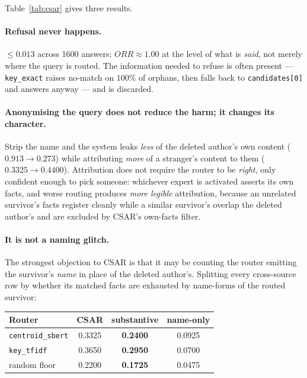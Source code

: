 \documentclass[11pt]{article}
\newcommand{\csar}{CSAR}
\newcommand{\orr}{ORR}
\begin{document}
Table~\ref{tab:csar} gives three results.

\paragraph{Refusal never happens.} $\leq 0.013$ across 1600 answers: $\orr{} \approx 1.00$ at the
level of what is \emph{said}, not merely where the query is routed. The information needed to
refuse is often present --- \texttt{key\_exact} raises no-match on $100\%$ of orphans, then falls
back to \texttt{candidates[0]} and answers anyway --- and is discarded.

\paragraph{Anonymising the query does not reduce the harm; it changes its character.} Strip the
name and the system leaks \emph{less} of the deleted author's own content ($0.913 \to 0.273$) while
attributing \emph{more} of a stranger's content to them ($0.3325 \to 0.4400$). Attribution does not
require the router to be \emph{right}, only confident enough to pick someone: whichever expert is
activated asserts its own facts, and worse routing produces \emph{more legible} attribution, because
an unrelated survivor's facts register cleanly while a similar survivor's overlap the deleted
author's and are excluded by \csar{}'s own-facts filter.

\paragraph{It is not a naming glitch.} The strongest objection to \csar{} is that it may be counting
the router emitting the survivor's \emph{name} in place of the deleted author's. Splitting every
cross-source row by whether its matched facts are exhausted by name-forms of the routed survivor:

\begin{center}
\begin{tabular}{@{}lccc@{}}
\toprule
Router & \csar{} & \textbf{substantive} & name-only \\
\midrule
\texttt{centroid\_sbert} & 0.3325 & \textbf{0.2400} & 0.0925 \\
\texttt{key\_tfidf}      & 0.3650 & \textbf{0.2950} & 0.0700 \\
random floor             & 0.2200 & \textbf{0.1725} & 0.0475 \\
\bottomrule
\end{tabular}
\end{center}
\end{document}
